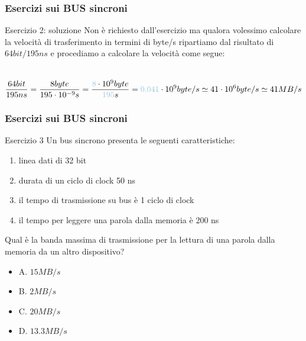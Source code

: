\begin{frame}
	\frametitle{Esercizi sui BUS sincroni}
	
	\begin{block}{Esercizio 2: soluzione}
		Non è richiesto dall'esercizio ma qualora volessimo calcolare la velocità di trasferimento in termini di byte/s ripartiamo dal risultato di $64bit/195ns$ e procediamo a calcolare la velocità come segue:\\~\\
		
		\begin{scriptsize}
		$$\frac{64bit}{195ns} = \frac{8byte}{195 \cdot 10^{-9} s} = \frac{{\color{CpuBlue}8} \cdot 10^{9}byte}{{\color{CpuBlue}195}s}= {\color{CpuBlue}0.041} \cdot 10^{9} byte/s \simeq 41 \cdot 10^{6} byte/s \simeq 41 MB/s$$
		\end{scriptsize}
		
	\end{block}
\end{frame}



\begin{frame}
	\frametitle{Esercizi sui BUS sincroni}
		
	\begin{block}{Esercizio 3}
		Un bus sincrono presenta le seguenti caratteristiche:
		\begin{scriptsize}
		\begin{enumerate}
			\item linea dati di 32 bit
			\item durata di un ciclo di clock 50 ns
			\item il tempo di trasmissione su bus è 1 ciclo di clock
			\item il tempo per leggere una parola dalla memoria è 200 ns
		\end{enumerate}
		\end{scriptsize}
		
		Qual è la banda massima di trasmissione per la lettura di una parola dalla memoria da un altro dispositivo?
		
		\begin{scriptsize}
		\begin{itemize}
			\item A. $15MB/s$
			\item B. $2MB/s$
			\item C. $20MB/s$
			\item D. $13.3MB/s$
		\end{itemize}
		\end{scriptsize}
	
	\end{block}
\end{frame}


